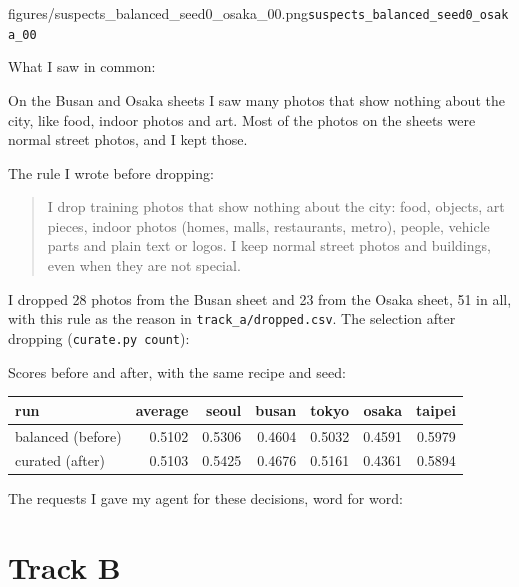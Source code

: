 \documentclass[11pt]{article}
\begin{document}
%
           {figures/suspects_balanced_seed0_osaka_00.png}{\texttt{suspects\_balanced\_seed0\_osaka\_00}}


What I saw in common:

On the Busan and Osaka sheets I saw many photos that show nothing about the city, like food, indoor photos and art. Most of the photos on the sheets were normal street photos, and I kept those.

The rule I wrote before dropping:

\begin{quote}
I drop training photos that show nothing about the city: food, objects, art pieces, indoor photos (homes, malls, restaurants, metro), people, vehicle parts and plain text or logos. I keep normal street photos and buildings, even when they are not special.
\end{quote}

I dropped 28 photos from the Busan sheet and 23 from the Osaka sheet, 51 in
all, with this rule as the reason in \texttt{track\_a/dropped.csv}. The
selection after dropping (\texttt{curate.py count}):


Scores before and after, with the same recipe and seed:

\begin{center}\footnotesize
\begin{tabular}{lrrrrrr}
\toprule
run & average & seoul & busan & tokyo & osaka & taipei \\
\midrule
balanced (before) & 0.5102 & 0.5306 & 0.4604 & 0.5032 & 0.4591 & 0.5979 \\
curated (after)   & 0.5103 & 0.5425 & 0.4676 & 0.5161 & 0.4361 & 0.5894 \\
\bottomrule
\end{tabular}
\end{center}

The requests I gave my agent for these decisions, word for word:


\section*{Track B}
\end{document}
